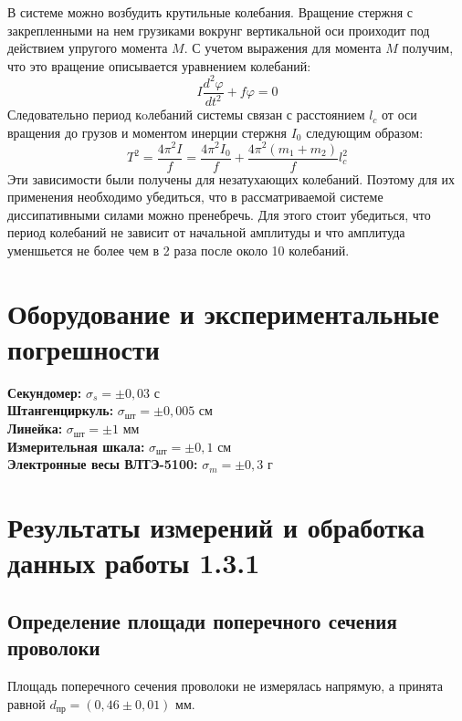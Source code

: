 \documentclass[a4paper,12pt]{article}
\begin{document}
В системе можно возбудить крутильные колебания. Вращение стержня с закрепленными
на нем грузиками вокрунг вертикальной оси проиходит под действием упругого момента $M$.
С учетом выражения для момента $M$ получим, что это вращение описывается уравнением колебаний:
\begin{equation}
    I\frac{d^2 \varphi }{d t^2} + f \varphi =0
\end{equation}
Следовательно период кoлебаний системы связан с расстоянием $l_c$ от оси вращения до грузов и
моментом инерции стержня $I_0$ следующим образом:
\begin{equation}\label{t-2-of-l-2}
    T^2=\frac{4 \pi^2 I}{f}=\frac{4 \pi^2 I_0}{f} + \frac{4 \pi^2 (m_1+m_2)}{f}l_c^2
\end{equation}
Эти зависимости были получены для незатухающих колебаний. Поэтому для их применения необходимо убедиться,
что в рассматриваемой системе диссипативными силами можно пренебречь. Для этого стоит убедиться, что период колебаний
не зависит от начальной амплитуды и что амплитуда уменшьется не более чем в 2 раза после около 10 колебаний.

\section{Оборудование и экспериментальные погрешности}

\textbf{Секундомер:} $\sigma_s = \pm 0,03$ с \\ 
\textbf{Штангенциркуль:} $\sigma_\text{шт} = \pm 0,005$ см \\
\textbf{Линейка:} $\sigma_\text{шт} = \pm 1$ мм \\
\textbf{Измерительная шкала:} $\sigma_\text{шт} = \pm 0,1$ см \\
\textbf{Электронные весы ВЛТЭ-5100:} $\sigma_m = \pm 0,3$ г \\


\section{Результаты измерений и обработка данных работы 1.3.1}

\subsection{Определение площади поперечного сечения проволоки}

Площадь поперечного сечения проволоки не измерялась напрямую, а принята равной $d_\text{пр} = (0,46 \pm 0,01) \text{ мм}$.
\end{document}
